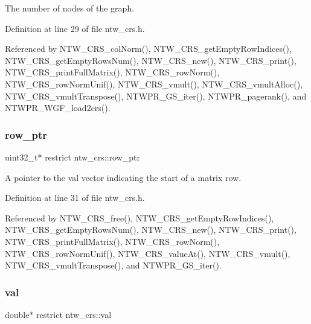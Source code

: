 The number of nodes of the graph. 

Definition at line 29 of file ntw\+\_\+crs.\+h.



Referenced by N\+T\+W\+\_\+\+C\+R\+S\+\_\+col\+Norm(), N\+T\+W\+\_\+\+C\+R\+S\+\_\+get\+Empty\+Row\+Indices(), N\+T\+W\+\_\+\+C\+R\+S\+\_\+get\+Empty\+Rows\+Num(), N\+T\+W\+\_\+\+C\+R\+S\+\_\+new(), N\+T\+W\+\_\+\+C\+R\+S\+\_\+print(), N\+T\+W\+\_\+\+C\+R\+S\+\_\+print\+Full\+Matrix(), N\+T\+W\+\_\+\+C\+R\+S\+\_\+row\+Norm(), N\+T\+W\+\_\+\+C\+R\+S\+\_\+row\+Norm\+Unif(), N\+T\+W\+\_\+\+C\+R\+S\+\_\+vmult(), N\+T\+W\+\_\+\+C\+R\+S\+\_\+vmult\+Alloc(), N\+T\+W\+\_\+\+C\+R\+S\+\_\+vmult\+Transpose(), N\+T\+W\+P\+R\+\_\+\+G\+S\+\_\+iter(), N\+T\+W\+P\+R\+\_\+pagerank(), and N\+T\+W\+P\+R\+\_\+\+W\+G\+F\+\_\+load2crs().

\mbox{\label{structntw__crs_abf117885ca226f2a82ff28dca7177c34}} 
\subsubsection{\texorpdfstring{row\+\_\+ptr}{row\_ptr}}
{\footnotesize\ttfamily uint32\+\_\+t$\ast$ restrict ntw\+\_\+crs\+::row\+\_\+ptr}

A pointer to the val vector indicating the start of a matrix\textquotesingle{} row. 

Definition at line 31 of file ntw\+\_\+crs.\+h.



Referenced by N\+T\+W\+\_\+\+C\+R\+S\+\_\+free(), N\+T\+W\+\_\+\+C\+R\+S\+\_\+get\+Empty\+Row\+Indices(), N\+T\+W\+\_\+\+C\+R\+S\+\_\+get\+Empty\+Rows\+Num(), N\+T\+W\+\_\+\+C\+R\+S\+\_\+new(), N\+T\+W\+\_\+\+C\+R\+S\+\_\+print(), N\+T\+W\+\_\+\+C\+R\+S\+\_\+print\+Full\+Matrix(), N\+T\+W\+\_\+\+C\+R\+S\+\_\+row\+Norm(), N\+T\+W\+\_\+\+C\+R\+S\+\_\+row\+Norm\+Unif(), N\+T\+W\+\_\+\+C\+R\+S\+\_\+value\+At(), N\+T\+W\+\_\+\+C\+R\+S\+\_\+vmult(), N\+T\+W\+\_\+\+C\+R\+S\+\_\+vmult\+Transpose(), and N\+T\+W\+P\+R\+\_\+\+G\+S\+\_\+iter().

\mbox{\label{structntw__crs_a5ed2cc918a69051b395e9b151a66867f}} 
\subsubsection{\texorpdfstring{val}{val}}
{\footnotesize\ttfamily double$\ast$ restrict ntw\+\_\+crs\+::val}

